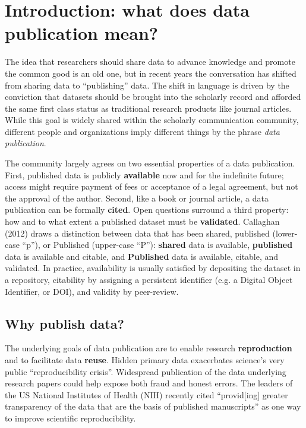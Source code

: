 \documentclass[10pt,twocolumn]{article}
\begin{document}
\section*{Introduction: what does data publication mean?}\label{introduction}

The idea that researchers should share data to advance knowledge and promote the common good is an old one, but in recent years the conversation has shifted from sharing data to ``publishing'' data.\cite{costello_motivating_2009,smith_data_2009,lawrence_data_2011}
The shift in language is driven by the conviction that datasets should be brought into the scholarly record and afforded the same first class status as traditional research products like journal articles.\cite{sarah_callaghan_making_2012}
While this goal is widely shared within the scholarly communication community, different people and organizations imply different things by the phrase \emph{data publication}.

The community largely agrees on two essential properties of a data publication.\cite{smith_data_2009,sarah_callaghan_making_2012}
First, published data is publicly \textbf{available} now and for the indefinite future; access might require payment of fees or acceptance of a legal agreement, but not the approval of the author.
Second, like a book or journal article, a data publication can be formally \textbf{cited}.
Open questions surround a third property: how and to what extent a published dataset must be \textbf{validated}.
Callaghan (2012)\cite{sarah_callaghan_making_2012} draws a distinction between data that has been shared, published (lower-case “p”), or Published (upper-case “P”): \textbf{shared} data is available, \textbf{published} data is available and citable, and \textbf{Published} data is available, citable, and validated.
In practice, availability is usually satisfied by depositing the dataset in a repository, citability by assigning a persistent identifier (e.g. a Digital Object Identifier, or DOI), and validity by peer-review.

\subsection*{Why publish data?}\label{why-publish-data}

The underlying goals of data publication are to enable research \textbf{reproduction} and to facilitate data \textbf{reuse}.
Hidden primary data exacerbates science's very public ``reproducibility crisis''.\cite{mobley_survey_2013,pashler_is_2012,zimmer_rise_2012,hiltzik_science_2013,begley_drug_2012}
Widespread publication of the data underlying research papers could help expose both fraud and honest errors.\cite{drew_lost_2013}
The leaders of the US National Institutes of Health (NIH) recently cited ``provid[ing] greater transparency of the data that are the basis of published manuscripts'' as one way to improve scientific reproducibility.\cite{collins_nih_2014}
\end{document}
